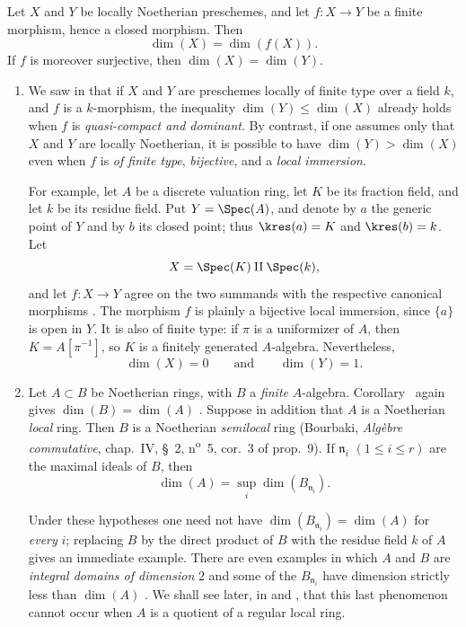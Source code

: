 \begin{corollary}[5.4.2]
\label{IV.5.4.2}
Let $X$ and $Y$ be locally Noetherian preschemes, and let
$f:X\to Y$ be a finite morphism, hence a closed morphism.
Then
\[
\dim(X)=\dim(f(X)).
\]
If $f$ is moreover surjective, then $\dim(X)=\dim(Y)$.
\end{corollary}

\begin{remarks}[5.4.3]
\label{IV.5.4.3}
\begin{enumerate}[{\rm(i)}]
\item
{}
\label{IV.5.4.3.i}
We saw in  that if $X$ and $Y$ are preschemes locally
of finite type over a field $k$, and $f$ is a $k$-morphism, the
inequality $\dim(Y)\leq\dim(X)$
already holds when $f$ is \emph{quasi-compact and dominant}.
By contrast, if one assumes only that $X$ and $Y$ are locally
Noetherian, it is possible to have $\dim(Y)>\dim(X)$ even when $f$ is
\emph{of finite type}, \emph{bijective}, and a \emph{local immersion}.

For example, let $A$ be a discrete valuation ring, let $K$ be its
fraction field, and let $k$ be its residue field.
Put $Y=\Spec(A)$, and denote by $a$ the generic point of $Y$ and by
$b$ its closed point; thus $\kres(a)=K$ and $\kres(b)=k$.
Let
\[
X=\Spec(K)\amalg\Spec(k),
\]
and let $f:X\to Y$ agree on the two summands with the respective
canonical morphisms .
The morphism $f$ is plainly a bijective local immersion, since
$\{a\}$ is open in $Y$.
It is also of finite type: if $\pi$ is a uniformizer of $A$, then
$K=A[\pi^{-1}]$, so $K$ is a finitely generated $A$-algebra.
Nevertheless,
\[
\dim(X)=0
\qquad\text{and}\qquad
\dim(Y)=1.
\]

\item
{}
\label{IV.5.4.3.ii}
Let $A\subset B$ be Noetherian rings, with $B$ a \emph{finite}
$A$-algebra.
Corollary~ again gives $\dim(B)=\dim(A)$
.
Suppose in addition that $A$ is a Noetherian \emph{local} ring.
Then $B$ is a Noetherian \emph{semilocal} ring
(Bourbaki, \emph{Alg\`ebre commutative}, chap.~IV, \S~2,
n\textsuperscript{o}~5, cor.~3 of prop.~9).
If $\mathfrak n_i$ $(1\leq i\leq r)$ are the maximal ideals of $B$,
then
\begin{equation}
\dim(A)=\sup_i\dim(B_{\mathfrak n_i}).
\tag{5.4.3.1}\label{IV.5.4.3.1}
\end{equation}

Under these hypotheses one need not have $\dim(B_{\mathfrak n_i})=\dim(A)$
for \emph{every} $i$; replacing $B$ by the direct product of $B$ with the
residue field $k$ of $A$ gives an immediate example.
There are even examples in which $A$ and $B$ are \emph{integral domains of
dimension} $2$ and some of the $B_{\mathfrak n_i}$ have dimension
strictly less than $\dim(A)$ .
We shall see later, in  and , that
this last phenomenon cannot occur when $A$ is a quotient of a
regular local ring.
\end{enumerate}
\end{remarks}
